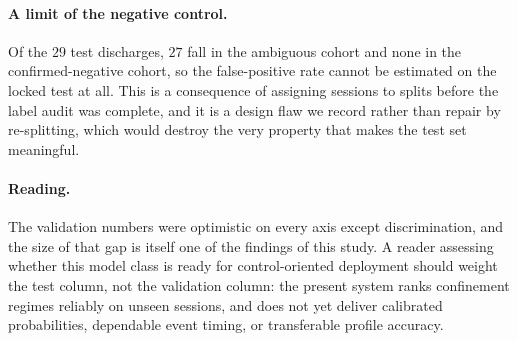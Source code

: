 \paragraph{A limit of the negative control.} Of the $29$ test discharges,
$27$ fall in the ambiguous cohort and none in the confirmed-negative
cohort, so the false-positive rate cannot be estimated on the locked test at
all. This is a consequence of assigning sessions to splits before the label
audit was complete, and it is a design flaw we record rather than repair by
re-splitting, which would destroy the very property that makes the test set
meaningful.

\paragraph{Reading.} The validation numbers were optimistic on every axis
except discrimination, and the size of that gap is itself one of the
findings of this study. A reader assessing whether this model class is
ready for control-oriented deployment should weight the test column, not
the validation column: the present system ranks confinement regimes
reliably on unseen sessions, and does not yet deliver calibrated
probabilities, dependable event timing, or transferable profile
accuracy.
